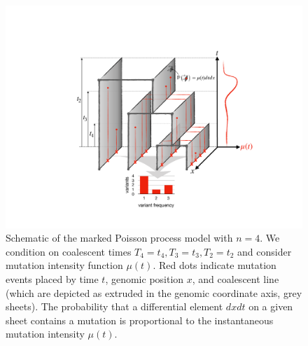 \documentclass[11pt]{article}
\begin{document}
\begin{figure}
\centering
\includegraphics[width=\textwidth]{figures/model}
\caption{Schematic of the marked Poisson process model with $n=4$.
We condition on coalescent times $T_4=t_4,T_3=t_3,T_2=t_2$ and consider mutation intensity function $\mu(t)$.
Red dots indicate mutation events placed by time $t$, genomic position $x$, and coalescent line (which are depicted as extruded in the genomic coordinate axis, grey sheets).
The probability that a differential element $dxdt$ on a given sheet contains a mutation is proportional to the instantaneous mutation intensity $\mu(t)$.
}
\label{fig:model}
\end{figure}
\end{document}
